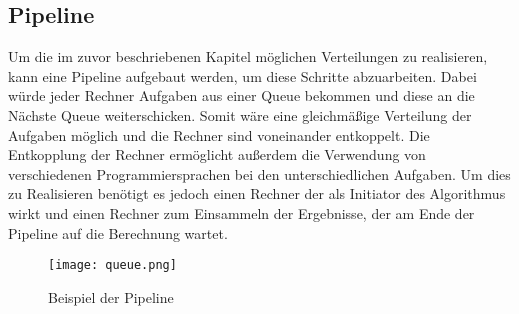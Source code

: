 \subsection{Pipeline}

Um die im zuvor beschriebenen Kapitel möglichen Verteilungen zu realisieren, kann eine Pipeline aufgebaut werden, um diese Schritte abzuarbeiten. Dabei würde jeder Rechner Aufgaben aus einer Queue bekommen und diese an die Nächste Queue weiterschicken. Somit wäre eine gleichmäßige Verteilung der Aufgaben möglich und die Rechner sind voneinander entkoppelt. Die Entkopplung der Rechner ermöglicht außerdem die Verwendung von verschiedenen Programmiersprachen bei den unterschiedlichen Aufgaben. Um dies zu Realisieren benötigt es jedoch einen Rechner der als Initiator des Algorithmus wirkt und einen Rechner zum Einsammeln der Ergebnisse, der am Ende der Pipeline auf die Berechnung wartet.

\begin{figure}[h]
	\centering
	\texttt{[image: queue.png]}
	\caption{Beispiel der Pipeline}
	\label{pipeline}
\end{figure}